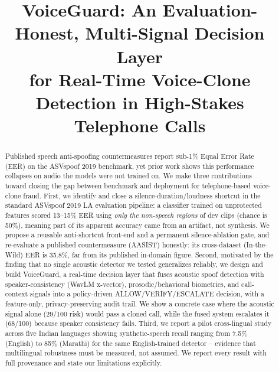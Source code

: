 \documentclass[conference]{IEEEtran}
\begin{document}
\title{VoiceGuard: An Evaluation-Honest, Multi-Signal Decision Layer\\
for Real-Time Voice-Clone Detection in High-Stakes Telephone Calls}

\author{
}

\maketitle

\begin{abstract}
Published speech anti-spoofing countermeasures report sub-1\% Equal Error
Rate (EER) on the ASVspoof 2019 benchmark, yet prior work shows this
performance collapses on audio the models were not trained on. We make
three contributions toward closing the gap between benchmark and
deployment for telephone-based voice-clone fraud. First, we identify and
close a silence-duration/loudness shortcut in the standard ASVspoof 2019
LA evaluation pipeline: a classifier trained on unprotected features
scored 13--15\% EER using \emph{only the non-speech regions} of dev
clips (chance is 50\%), meaning part of its apparent accuracy came from
an artifact, not synthesis. We propose a reusable anti-shortcut
front-end and a permanent silence-ablation gate, and re-evaluate a
published countermeasure (AASIST) honestly: its cross-dataset
(In-the-Wild) EER is 35.8\%, far from its  published in-domain figure.
Second, motivated by the finding that no single acoustic detector we
tested generalizes reliably, we design and build VoiceGuard, a
real-time decision layer that fuses acoustic spoof detection with
speaker-consistency (WavLM x-vector), prosodic/behavioral biometrics,
and call-context signals into a policy-driven ALLOW/VERIFY/ESCALATE
decision, with a feature-only, privacy-preserving audit trail. We show
a concrete case where the acoustic signal alone (29/100 risk) would
pass a cloned call, while the fused system escalates it (68/100) because
speaker consistency fails. Third, we report a pilot cross-lingual study
across five Indian languages showing synthetic-speech recall ranging
from 7.5\% (English) to 85\% (Marathi) for the same English-trained
detector -- evidence that multilingual robustness must be measured, not
assumed. We report every result with full provenance and state our
limitations explicitly.
\end{abstract}
\end{document}

